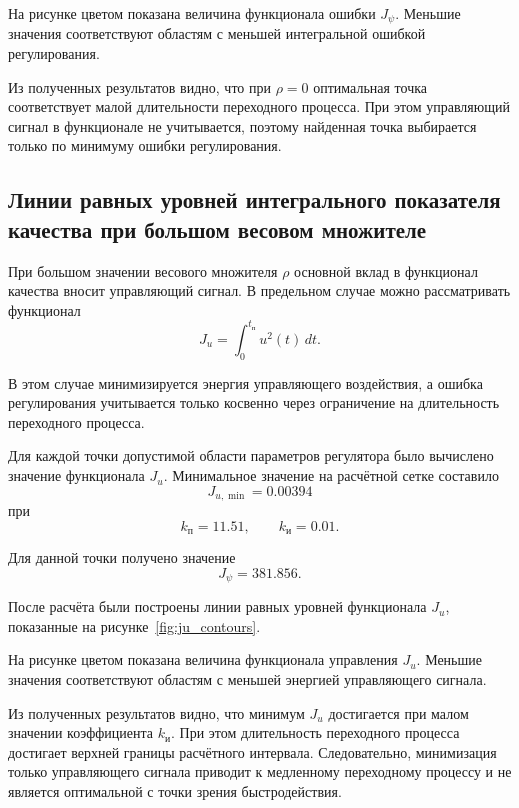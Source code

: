 На рисунке цветом показана величина функционала ошибки \(J_{\psi}\). Меньшие значения соответствуют областям с меньшей интегральной ошибкой регулирования.

Из полученных результатов видно, что при \(\rho = 0\) оптимальная точка соответствует малой длительности переходного процесса. При этом управляющий сигнал в функционале не учитывается, поэтому найденная точка выбирается только по минимуму ошибки регулирования.

\subsection{Линии равных уровней интегрального показателя качества при большом весовом множителе}

При большом значении весового множителя \(\rho\) основной вклад в функционал качества вносит управляющий сигнал. В предельном случае можно рассматривать функционал
\begin{equation}
J_u
=
\int_0^{t_{\text{п}}}
u^2(t)\,dt.
\end{equation}

В этом случае минимизируется энергия управляющего воздействия, а ошибка регулирования учитывается только косвенно через ограничение на длительность переходного процесса.

Для каждой точки допустимой области параметров регулятора было вычислено значение функционала \(J_u\). Минимальное значение на расчётной сетке составило
\begin{equation}
J_{u,\min}=0.00394
\end{equation}
при
\begin{equation}
k_{\text{п}}=11.51,
\qquad
k_{\text{и}}=0.01.
\end{equation}

Для данной точки получено значение
\begin{equation}
J_{\psi}=381.856.
\end{equation}

После расчёта были построены линии равных уровней функционала \(J_u\), показанные на рисунке~\ref{fig:ju_contours}.


На рисунке цветом показана величина функционала управления \(J_u\). Меньшие значения соответствуют областям с меньшей энергией управляющего сигнала.

Из полученных результатов видно, что минимум \(J_u\) достигается при малом значении коэффициента \(k_{\text{и}}\). При этом длительность переходного процесса достигает верхней границы расчётного интервала. Следовательно, минимизация только управляющего сигнала приводит к медленному переходному процессу и не является оптимальной с точки зрения быстродействия.

